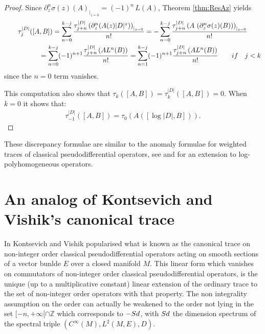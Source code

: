 \documentclass[11pt]{article}
\def \Z {\mathbb Z}
\def \Ci {{C^\infty}}
\numberwithin{equation}{section}
\begin{document}
\begin{proof}
Since  $\partial^n_z \sigma(z)(A)_{\vert_{z=0}}=
(-1)^n\, L(A)$,   Theorem \ref{thm:ResAz}
    yields
\begin{gather*}
 \tau_j^{\vert D\vert}([A,B]) =  \sum_{n= 0}^{k-j} \frac{\tau_{j+n}^{\vert D\vert} \left(\partial_z^n (A(z)
  \vert D\vert^z)\right)_{\vert_{z=0}}}{n!}
 =  -\sum_{n= 0}^{k-j} \frac{\tau_{j+n}^{\vert D\vert} \left(A\, \left(\partial_z^n \sigma(z)
  (B)\right) \right)_{\vert_{z=0}}}{n!}\\
 \phantom{\tau_j^{\vert D\vert}([A,B])}{}
 =  \sum_{n= 0}^{k-j} (-1)^{n+1}\frac{\tau_{j+n}^{\vert D\vert} \left(
    A L^n(B)\right)}{n!}
 =  \sum_{n=1}^{k-j} (-1)^{n+1}\frac{\tau_{j+n}^{\vert D\vert} \left(
    A L^n(B)\right)}{n!}\qquad{\rm if}\quad j<k
    \end{gather*}
since the $n=0$ term vanishes.

  This computation also shows that $ \tau_k([A,B]) =\tau_k^{\vert D\vert} ([A,B])=0$.  When
  $k=0$ it  shows that:
\begin{gather*}
\tau_{-1}^{\vert D\vert}([A,B ])=\tau_{0}\left( A \left([ \log
    \vert D\vert ,B] \right)\right).\tag*{\qed}
    \end{gather*}\renewcommand{\qed}{}
\end{proof}

These discrepancy formulae are similar to the anomaly formulae for weighted
traces of classical  pseudodif\/ferential operators, see \cite{MN,CDMP,PS}  and
 \cite{Pa1}  for an extension  to  log-polyhomogeneous operators.


\section{ An analog of Kontsevich and Vishik's canonical trace}\label{section7}

In \cite{KV} Kontsevich and Vishik popularised what is known as the canonical trace on
non-integer order classical pseudodif\/ferential operators acting on smooth
sections of a vector bunlde $E$ over a closed manifold $
M$. This linear form
which vanishes on commutators of non-integer order classical pseudodif\/ferential
operators, is the unique (up to a multiplicative constant) linear extension of the ordinary trace to the set of
non-integer order operators with that property. The non integrality assumption
on the order can actually be weakened to  the order not lying in the set  $[{-}n,+\infty[\cap
\Z$ which corresponds to $- {\rm Sd}$, with ${\rm Sd}$ the dimension spectrum of the spectral triple
$\left(\Ci(M), L^2(M, E), D\right).$
\end{document}
